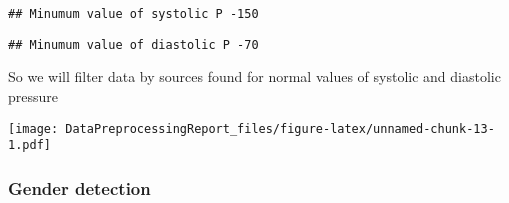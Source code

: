 \documentclass[
]{article}
\newenvironment{Shaded}{\begin{snugshade}}{\end{snugshade}}
\newcommand{\AttributeTok}[1]{\textcolor[rgb]{0.13,0.29,0.53}{#1}}
\newcommand{\DecValTok}[1]{\textcolor[rgb]{0.00,0.00,0.81}{#1}}
\newcommand{\FunctionTok}[1]{\textcolor[rgb]{0.13,0.29,0.53}{\textbf{#1}}}
\newcommand{\NormalTok}[1]{#1}
\newcommand{\OtherTok}[1]{\textcolor[rgb]{0.56,0.35,0.01}{#1}}
\newcommand{\SpecialCharTok}[1]{\textcolor[rgb]{0.81,0.36,0.00}{\textbf{#1}}}
\newcommand{\StringTok}[1]{\textcolor[rgb]{0.31,0.60,0.02}{#1}}
\begin{document}
\begin{verbatim}
## Minumum value of systolic P -150
\end{verbatim}

\begin{Shaded}
\end{Shaded}

\begin{verbatim}
## Minumum value of diastolic P -70
\end{verbatim}

So we will filter data by sources found for normal values of systolic
and diastolic pressure

\begin{Shaded}
\end{Shaded}

\texttt{[image: DataPreprocessingReport\_files/figure-latex/unnamed-chunk-13-1.pdf]}

\hypertarget{gender-detection}{%
\subsubsection{Gender detection}\label{gender-detection}}
\end{document}
